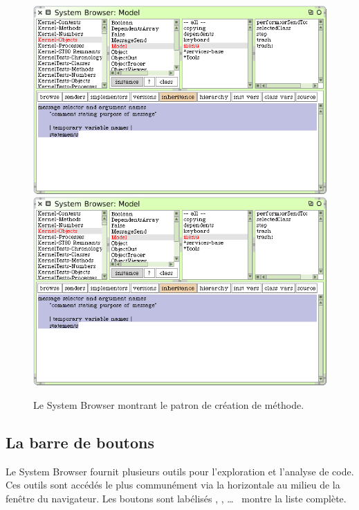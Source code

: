 \documentclass[a4paper,10pt,twoside]{book}
\begin{document}
\begin{figure}[htbp]
   \centering
   \ifluluelse
	   {\includegraphics [width=\textwidth]{SystemBrowserMethodTemplate}}
	   {\includegraphics[scale=.7]{SystemBrowserMethodTemplate}}
   \caption{Le System Browser montrant le patron de cr\'eation de m\'ethode.
   \label{fig:SystemBrowserMethodTemplate}}
\end{figure}

\subsection{La barre de boutons}
\label{sec:ButtonBar}

Le System Browser fournit plusieurs outils pour l'exploration et 
l'analyse de code. Ces outils sont acc\'ed\'es le plus commun\'ement
via la 
 horizontale au milieu
de la fen\^etre du navigateur. Les boutons sont lab\'elis\'es 
, , \ldots{}\ %
 montre la liste compl\`ete.
\end{document}
